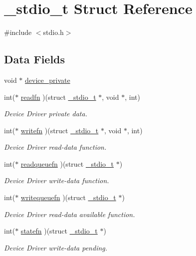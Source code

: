 \hypertarget{struct__stdio__t}{\section{\-\_\-stdio\-\_\-t Struct Reference}
\label{struct__stdio__t}
}


{\ttfamily \#include $<$stdio.\-h$>$}

\subsection*{Data Fields}
\begin{DoxyCompactItemize}
\item 
void $\ast$ \hyperlink{struct__stdio__t_abe889179e50490e5eb8d2a3592166638}{device\-\_\-private}
\item 
int($\ast$ \hyperlink{struct__stdio__t_a3698bb7d1020290bd662cf2e31c9d2c9}{readfn} )(struct \hyperlink{struct__stdio__t}{\-\_\-stdio\-\_\-t} $\ast$, void $\ast$, int)
\begin{DoxyCompactList}\small\item\em Device Driver private data. \end{DoxyCompactList}\item 
int($\ast$ \hyperlink{struct__stdio__t_aa50ed1df960be87cd28e05a1df7e9ddd}{writefn} )(struct \hyperlink{struct__stdio__t}{\-\_\-stdio\-\_\-t} $\ast$, void $\ast$, int)
\begin{DoxyCompactList}\small\item\em Device Driver read-\/data function. \end{DoxyCompactList}\item 
int($\ast$ \hyperlink{struct__stdio__t_a302b5c7d886e2ad5831e7fb40129d10e}{readqueuefn} )(struct \hyperlink{struct__stdio__t}{\-\_\-stdio\-\_\-t} $\ast$)
\begin{DoxyCompactList}\small\item\em Device Driver write-\/data function. \end{DoxyCompactList}\item 
int($\ast$ \hyperlink{struct__stdio__t_ae78e9d8689c33c835ac7551504937851}{writequeuefn} )(struct \hyperlink{struct__stdio__t}{\-\_\-stdio\-\_\-t} $\ast$)
\begin{DoxyCompactList}\small\item\em Device Driver read-\/data available function. \end{DoxyCompactList}\item 
int($\ast$ \hyperlink{struct__stdio__t_ac2642f9c5da1a64df85c6d67783a75e2}{statefn} )(struct \hyperlink{struct__stdio__t}{\-\_\-stdio\-\_\-t} $\ast$)
\begin{DoxyCompactList}\small\item\em Device Driver write-\/data pending. \end{DoxyCompactList}\end{DoxyCompactItemize}


